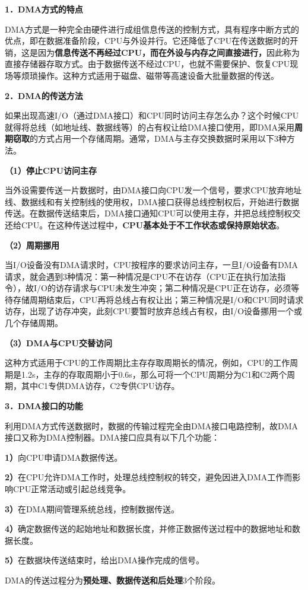 {\textbf{1．DMA方式的特点}}

DMA方式是一种完全由硬件进行成组信息传送的控制方式，具有程序中断方式的优点，即在数据准备阶段，CPU与外设并行。它还降低了CPU在传送数据时的开销，这是因为\textbf{信息传送不再经过CPU，而在外设与内存之间直接进行，}因此称为直接存储器存取方式。由于数据传送不经过CPU，也就不需要保护、恢复CPU现场等烦琐操作。这种方式适用于磁盘、磁带等高速设备大批量数据的传送。

{\textbf{2．DMA的传送方法}}

如果出现高速I/O（通过DMA接口）和CPU同时访问主存怎么办？这个时候CPU就得将总线（如地址线、数据线等）的占有权让给DMA接口使用，即DMA采用\textbf{周期窃取}的方式占用一个存储周期。通常，DMA与主存交换数据时采用以下3种方法。

\textbf{（1）停止CPU访问主存}

当外设需要传送一片数据时，由DMA接口向CPU发一个信号，要求CPU放弃地址线、数据线和有关控制线的使用权，DMA接口获得总线控制权后，开始进行数据传送。在数据传送结束后，DMA接口通知CPU可以使用主存，并把总线控制权交还给CPU。在这种传送过程中，\textbf{CPU基本处于不工作状态或保持原始状态}。

\textbf{（2）周期挪用}

当I/O设备没有DMA请求时，CPU按程序的要求访问主存，一旦I/O设备有DMA请求，就会遇到3种情况：第一种情况是{CPU不在访存}（CPU正在执行加法指令），故I/O的访存请求与CPU未发生冲突；第二种情况是{CPU正在访存，}必须等待存储周期结束后，CPU再将总线占有权让出；第三种情况是{I/O和CPU同时请求访存}，出现了访存冲突，此刻CPU要暂时放弃总线占有权，由I/O设备挪用一个或几个存储周期。

\textbf{（3）DMA与CPU交替访问}

这种方式适用于CPU的工作周期比主存存取周期长的情况，例如，CPU的工作周期是1.2s，主存的存取周期小于0.6s，那么可将一个CPU周期分为C1和C2两个周期，其中C1专供DMA访存，C2专供CPU访存。

{\textbf{3．DMA接口的功能}}

利用DMA方式传送数据时，数据的传输过程完全由DMA接口电路控制，故DMA接口又称为DMA控制器。{DMA接口应具有以下几个功能：}

\textbf{1）}向CPU申请DMA数据传送。

\textbf{2）}在CPU允许DMA工作时，处理总线控制权的转交，避免因进入DMA工作而影响CPU正常活动或引起总线竞争。

\textbf{3）}在DMA期间管理系统总线，控制数据传送。

\textbf{4）}确定数据传送的起始地址和数据长度，并修正数据传送过程中的数据地址和数据长度。

\textbf{5）}在数据块传送结束时，给出DMA操作完成的信号。

DMA的传送过程分为\textbf{预处理、数据传送和后处理}3个阶段。
